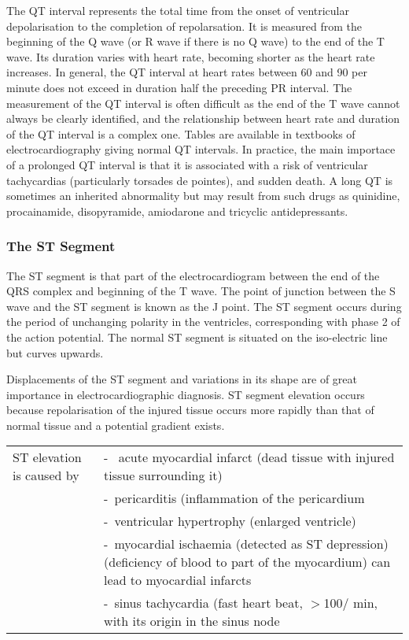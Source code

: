 The QT interval represents the total time from the onset of ventricular
depolarisation to the completion of repolarsation. It is measured from the
beginning of the Q wave (or R wave if there is no Q wave) to the end of the T
wave. Its duration varies with heart rate, becoming shorter as the heart rate
increases. In general, the QT interval at heart rates between 60 and 90 per
minute does not exceed in duration half the preceding PR interval. The
measurement of the QT interval is often difficult as the end of the T wave
cannot always be clearly identified, and the relationship between heart rate
and duration of the QT interval is a complex one. Tables are available in
textbooks of electrocardiography giving normal QT intervals. In practice, the
main importace of a prolonged QT interval is that it is associated with a risk
of ventricular tachycardias (particularly torsades de pointes), and sudden
death. A long QT is sometimes an inherited abnormality but may result from
such drugs as quinidine, procainamide, disopyramide, amiodarone and tricyclic
antidepressants.

\subsubsection{The ST Segment}
The ST segment is that part of the electrocardiogram between the end of the
QRS complex and beginning of the T wave. The point of junction between the S
wave and the ST segment is known as the J point. The ST segment occurs during
the period of unchanging polarity in the ventricles, corresponding with phase
2 of the action potential. The normal ST segment is situated on the
iso-electric line but curves upwards.

Displacements of the ST segment and variations in its shape are of great
importance in electrocardiographic diagnosis. ST segment elevation occurs because repolarisation of the injured tissue
occurs more rapidly than that of normal tissue and a potential gradient
exists.

\begin{tabular}{lp{10cm}}
ST elevation is caused by &-~ acute myocardial infarct (dead tissue with
injured tissue surrounding it)\\
 &-~pericarditis (inflammation of the pericardium\\
 &-~ventricular hypertrophy (enlarged ventricle)\\
 &-~myocardial ischaemia (detected as ST depression) (deficiency of blood to
part of the myocardium) can lead to myocardial infarcts\\
 &-~sinus tachycardia (fast heart beat, $>$100/ min, with its origin in the
 sinus node
\end{tabular}


